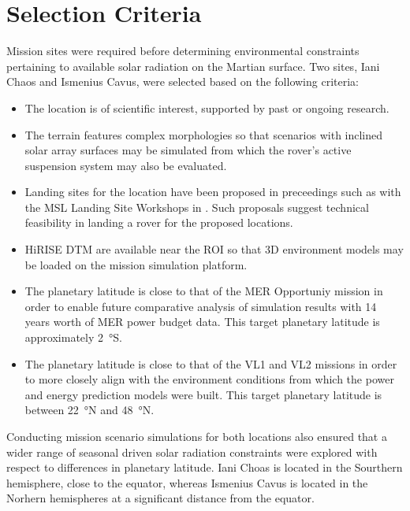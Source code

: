 \section{Selection Criteria}
\label{sec:MissionSites:SelectionCriteria}
Mission sites were required before determining environmental constraints pertaining to available solar radiation on the Martian surface. Two sites, Iani Chaos and Ismenius Cavus, were selected based on the following criteria:

\begin{itemize}
    \item The location is of scientific interest, supported by past or ongoing research.
    \item The terrain features complex morphologies so that scenarios with inclined solar array surfaces may be simulated from which the rover's active suspension system may also be evaluated.
    \item Landing sites for the location have been proposed in preceedings such as with the \ac{MSL} Landing Site Workshops in . Such proposals suggest technical feasibility in landing a rover for the proposed locations.
    \item \ac{HiRISE} \ac{DTM} are available near the \ac{ROI} so that 3D environment models may be loaded on the mission simulation platform.
    \item The planetary latitude is close to that of the \ac{MER} Opportuniy mission in order to enable future comparative analysis of simulation results with 14 years worth of \ac{MER} power budget data. This target planetary latitude is approximately \SI{2}{\degree}S.
    \item The planetary latitude is close to that of the \ac{VL1} and \ac{VL2} missions in order to more closely align with the environment conditions from which the power and energy prediction models were built. This target planetary latitude is between \SI{22}{\degree}N and \SI{48}{\degree}N.
\end{itemize}

Conducting mission scenario simulations for both locations also ensured that a wider range of seasonal driven solar radiation constraints were explored with respect to differences in planetary latitude. Iani Choas is located in the Sourthern hemisphere, close to the equator, whereas Ismenius Cavus is located in the Norhern hemispheres at a significant distance from the equator.

\clearpage
